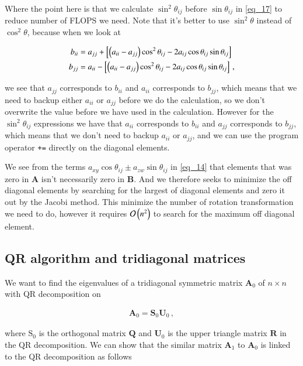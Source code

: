 \documentclass[11pt,english,a4paper]{article}
\begin{document}
\begin{flushleft}
Where the point here is that we calculate $\sin^2\theta_{ij}$ before $\sin\theta_{ij}$ in \eqref{eq_17} to reduce number of FLOPS we need. Note that it's better to use $\sin^2\theta$ instead of $\cos^2\theta$, because when we look at 

\begin{align*}
b_{ii} &= a_{jj} + \left[{\left({a_{ii}-a_{jj}}\right)\cos^2\theta_{ij} - 2a_{ij}\cos\theta_{ij}\sin\theta_{ij}}\right]
\\
b_{jj} &= a_{ii} - \left[{\left({a_{ii}-a_{jj}}\right)\cos^2\theta_{ij} - 2a_{ij}\cos\theta_{ij}\sin\theta_{ij}}\right] \,,
\end{align*}

we see that $a_{jj}$ corresponds to $b_{ii}$ and $a_{ii}$ corresponds to $b_{jj}$, which means that we need to backup either $a_{ii}$ or $a_{jj}$ before we do the calculation, so we don't overwrite the value before we have used in the calculation. However for the $\sin^2\theta_{ij}$ expressions we have that $a_{ii}$ corresponds to $b_{ii}$ and $a_{jj}$ corresponds to $b_{jj}$, which means that we don't need to backup $a_{ii}$ or $a_{jj}$, and we can  use the program operator \texttt{+=} directly on the diagonal elements. \linebreak

We see from the terms $a_{xy}\cos\theta_{ij}\pm a_{zw}\sin\theta_{ij}$ in \eqref{eq_14} that elements that was zero in $\textbf{A}$ isn't necessarily zero in $\textbf{B}$. And we therefore seeks to minimize the off diagonal elements by searching for the largest of diagonal elements and zero it out by the Jacobi method. This minimize the number of rotation transformation we need to do, however it requires $\mathcal{O}\left({n^2}\right)$ to search for the maximum off diagonal element.

\subsection{QR algorithm and tridiagonal matrices}

We want to find the eigenvalues of a tridiagonal symmetric matrix $\textbf{A}_0$ of $n\times n$ with QR decomposition on

\begin{align*}
\textbf{A}_0 = \textbf{S}_0\textbf{U}_0 \,,
\end{align*}

where $\text{S}_0$ is the orthogonal matrix $\textbf{Q}$ and $\textbf{U}_0$ is the upper triangle matrix $\textbf{R}$ in the QR decomposition. We can show that the similar matrix $\textbf{A}_1$ to $\textbf{A}_0$ is linked to the QR decomposition as follows


\end{flushleft}
\end{document}
